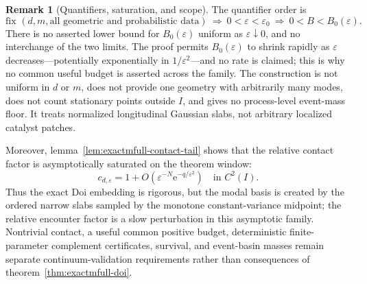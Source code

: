 \documentclass{iopjournal}
\newcommand{\e}{\mathrm e}
\theoremstyle{plain}
\theoremstyle{definition}
\newtheorem{remark}[theorem]{Remark}
\begin{document}
\begin{remark}[Quantifiers, saturation, and scope]
\label{rem:exactmfull-scope}
The quantifier order is
\begin{equation}
 \text{fix }(d,m,\text{all geometric and probabilistic data})
 \ \Longrightarrow\
 0<\varepsilon<\varepsilon_0
 \ \Longrightarrow\
 0<B<B_0(\varepsilon).
 \label{eq:exactmfull-quantifier-order}
\end{equation}
There is no asserted lower bound for \(B_0(\varepsilon)\) uniform as
\(\varepsilon\downarrow0\), and no interchange of the two limits.  The proof
permits \(B_0(\varepsilon)\) to shrink rapidly as \(\varepsilon\)
decreases---potentially exponentially in \(1/\varepsilon^2\)---and no rate is
claimed; this is why no common useful budget is asserted across the family.
The construction is not uniform in \(d\) or \(m\), does not provide one
geometry with arbitrarily many modes, does not count stationary points
outside \(I\), and gives no process-level event-mass floor.  It treats
normalized longitudinal Gaussian slabs, not arbitrary localized catalyst
patches.

Moreover, lemma~\ref{lem:exactmfull-contact-tail} shows that the relative
contact factor is asymptotically saturated on the theorem window:
\begin{equation}
 c_{d,\varepsilon}=1
 +O(\varepsilon^{-N}\e^{-q/\varepsilon^2})
 \quad\text{in }C^2(I).
 \label{eq:exactmfull-saturated-contact}
\end{equation}
Thus the exact Doi embedding is rigorous, but the modal basis is created by
the ordered narrow slabs sampled by the monotone constant-variance midpoint;
the relative encounter factor is a slow perturbation in this asymptotic
family.  Nontrivial contact, a useful common positive budget, deterministic
finite-parameter complement certificates, survival, and event-basin masses
remain separate continuum-validation requirements rather than consequences
of theorem~\ref{thm:exactmfull-doi}.
\end{remark}

\nocite{grebenkov2020multiple}


\end{document}
